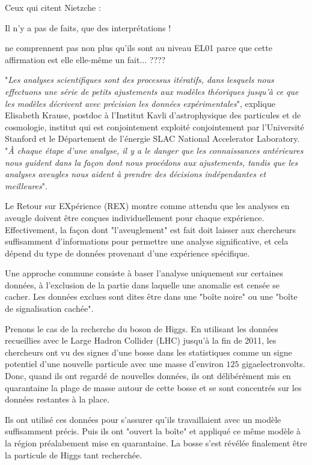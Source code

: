 	Ceux qui citent Nietzche :
	\begin{fquote}Il n'y a pas de faits, que des interprétations !
 	\end{fquote}
 	ne comprennent pas non plus qu'ils sont au niveau EL01 parce que cette affirmation est elle elle-même un fait... ????

	"\textit{Les analyses scientifiques sont des processus it\'eratifs, dans lesquels nous effectuons une s\'erie de petits ajustements aux modèles th\'eoriques jusqu'à ce que les modèles d\'ecrivent avec pr\'ecision les donn\'ees exp\'erimentales}", explique Elisabeth Krause, postdoc à l'Institut Kavli d'astrophysique des particules et de cosmologie, institut qui est conjointement exploit\'e conjointement par l'Universit\'e Stanford et le D\'epartement de l'\'energie SLAC National Accelerator Laboratory. "\textit{À chaque \'etape d'une analyse, il y a le danger que les connaissances ant\'erieures nous guident dans la façon dont nous proc\'edons aux ajustements, tandis que les analyses aveugles nous aident à prendre des d\'ecisions ind\'ependantes et meilleures}".
	
	Le Retour sur EXp\'erience (REX) montre comme attendu que les analyses en aveugle doivent être conçues individuellement pour chaque exp\'erience. Effectivement, la façon dont "l'aveuglement" est fait doit laisser aux chercheurs suffisamment d'informations pour permettre une analyse significative, et cela d\'epend du type de donn\'ees provenant d'une exp\'erience sp\'ecifique.

	Une approche commune consiste à baser l'analyse uniquement sur certaines donn\'ees, à l'exclusion de la partie dans laquelle une anomalie est cens\'ee se cacher. Les donn\'ees exclues sont dites être dans une "boîte noire" ou une "boîte de signalisation cach\'ee".

	Prenons le cas de la recherche du boson de Higgs. En utilisant les donn\'ees recueillies avec le Large Hadron Collider (LHC) jusqu'à la fin de 2011, les chercheurs ont vu des signes d'une bosse dans les statistiques comme un signe potentiel d'une nouvelle particule avec une masse d'environ $ 125 $ gigaelectronvolts. Donc, quand ils ont regard\'e de nouvelles donn\'ees, ils ont d\'elib\'er\'ement mis en quarantaine la plage de masse autour de cette bosse et se sont concentr\'es sur les donn\'ees restantes à la place.
	
	Ils ont utilis\'e ces donn\'ees pour s'assurer qu'ils travaillaient avec un modèle suffisamment pr\'ecis. Puis ils ont "ouvert la boîte" et appliqu\'e ce même modèle à la r\'egion pr\'ealabement mise en quarantaine. La bosse s'est r\'ev\'el\'ee finalement être la particule de Higgs tant recherch\'ee.

